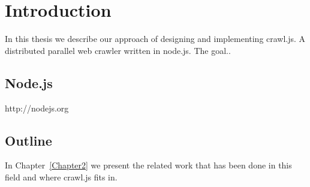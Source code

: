 
\chapter{Introduction} %

\label{Chapter1} %


In this thesis we describe our approach of designing and implementing crawl.js. A distributed parallel web crawler written in node.js.
The goal..


\section{Node.js}

http://nodejs.org

\section{Outline}
In Chapter~\ref{Chapter2} we present the related work that has been done in this field and where crawl.js fits in.

